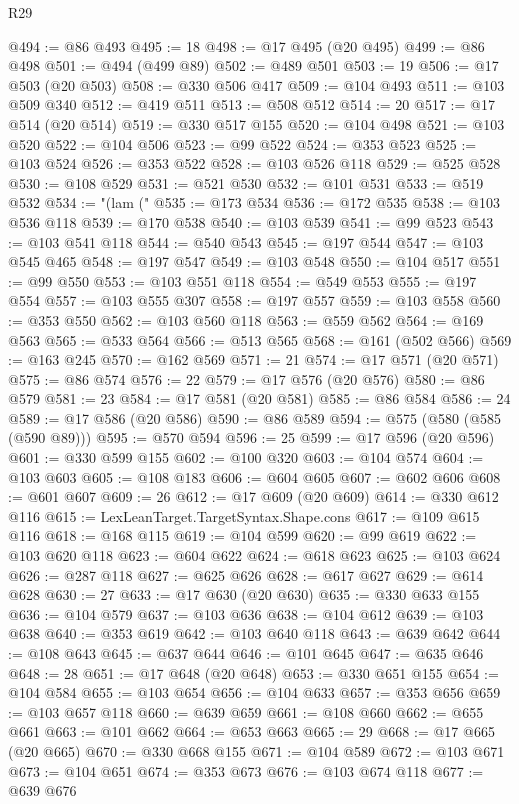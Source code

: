 \begin{lexlean}{R29}
\begin{coremodule}
@494 := @86 @493
@495 := 18
@498 := @17 @495 (@20 @495)
@499 := @86 @498
@501 := @494 (@499 @89)
@502 := @489 @501
@503 := 19
@506 := @17 @503 (@20 @503)
@508 := @330 @506 @417
@509 := @104 @493
@511 := @103 @509 @340
@512 := @419 @511
@513 := @508 @512
@514 := 20
@517 := @17 @514 (@20 @514)
@519 := @330 @517 @155
@520 := @104 @498
@521 := @103 @520
@522 := @104 @506
@523 := @99 @522
@524 := @353 @523
@525 := @103 @524
@526 := @353 @522
@528 := @103 @526 @118
@529 := @525 @528
@530 := @108 @529
@531 := @521 @530
@532 := @101 @531
@533 := @519 @532
@534 := "(lam ("
@535 := @173 @534
@536 := @172 @535
@538 := @103 @536 @118
@539 := @170 @538
@540 := @103 @539
@541 := @99 @523
@543 := @103 @541 @118
@544 := @540 @543
@545 := @197 @544
@547 := @103 @545 @465
@548 := @197 @547
@549 := @103 @548
@550 := @104 @517
@551 := @99 @550
@553 := @103 @551 @118
@554 := @549 @553
@555 := @197 @554
@557 := @103 @555 @307
@558 := @197 @557
@559 := @103 @558
@560 := @353 @550
@562 := @103 @560 @118
@563 := @559 @562
@564 := @169 @563
@565 := @533 @564
@566 := @513 @565
@568 := @161 (@502 @566)
@569 := @163 @245
@570 := @162 @569
@571 := 21
@574 := @17 @571 (@20 @571)
@575 := @86 @574
@576 := 22
@579 := @17 @576 (@20 @576)
@580 := @86 @579
@581 := 23
@584 := @17 @581 (@20 @581)
@585 := @86 @584
@586 := 24
@589 := @17 @586 (@20 @586)
@590 := @86 @589
@594 := @575 (@580 (@585 (@590 @89)))
@595 := @570 @594
@596 := 25
@599 := @17 @596 (@20 @596)
@601 := @330 @599 @155
@602 := @100 @320
@603 := @104 @574
@604 := @103 @603
@605 := @108 @183
@606 := @604 @605
@607 := @602 @606
@608 := @601 @607
@609 := 26
@612 := @17 @609 (@20 @609)
@614 := @330 @612 @116
@615 := LexLeanTarget.TargetSyntax.Shape.cons
@617 := @109 @615 @116
@618 := @168 @115
@619 := @104 @599
@620 := @99 @619
@622 := @103 @620 @118
@623 := @604 @622
@624 := @618 @623
@625 := @103 @624
@626 := @287 @118
@627 := @625 @626
@628 := @617 @627
@629 := @614 @628
@630 := 27
@633 := @17 @630 (@20 @630)
@635 := @330 @633 @155
@636 := @104 @579
@637 := @103 @636
@638 := @104 @612
@639 := @103 @638
@640 := @353 @619
@642 := @103 @640 @118
@643 := @639 @642
@644 := @108 @643
@645 := @637 @644
@646 := @101 @645
@647 := @635 @646
@648 := 28
@651 := @17 @648 (@20 @648)
@653 := @330 @651 @155
@654 := @104 @584
@655 := @103 @654
@656 := @104 @633
@657 := @353 @656
@659 := @103 @657 @118
@660 := @639 @659
@661 := @108 @660
@662 := @655 @661
@663 := @101 @662
@664 := @653 @663
@665 := 29
@668 := @17 @665 (@20 @665)
@670 := @330 @668 @155
@671 := @104 @589
@672 := @103 @671
@673 := @104 @651
@674 := @353 @673
@676 := @103 @674 @118
@677 := @639 @676

\end{coremodule}
\end{lexlean}
